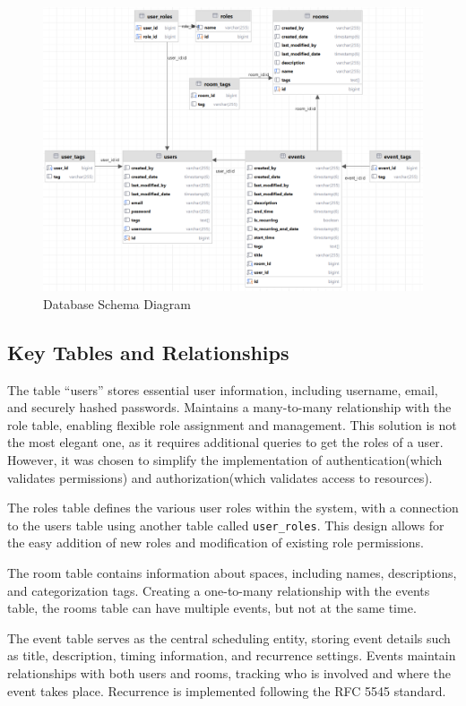 \begin{figure}[h]
    \centering
    \includegraphics[width=1\textwidth]{schemaDB}
    \caption{Database Schema Diagram}
    \label{fig:schemaDB}
\end{figure}

\subsection{Key Tables and Relationships}\label{subsec:key-tables}

The table ``users'' stores essential user information, including username, email, and securely hashed passwords.
Maintains a many-to-many relationship with the role table, enabling flexible role assignment and management.
This solution is not the most elegant one, as it requires additional queries to get the roles of a user.
However, it was chosen to simplify the implementation of authentication(which validates permissions) and authorization(which validates access to resources).


The roles table defines the various user roles within the system, with a connection to the users table using another table called \texttt{user\_roles}.
This design allows for the easy addition of new roles and modification of existing role permissions.

The room table contains information about spaces, including names, descriptions, and categorization tags.
Creating a one-to-many relationship with the events table, the rooms table can have multiple events, but not at the same time.

The event table serves as the central scheduling entity, storing event details such as title, description, timing information, and recurrence settings.
Events maintain relationships with both users and rooms, tracking who is involved and where the event takes place.
Recurrence is implemented following the RFC 5545 standard\cite{rfc5545}.

